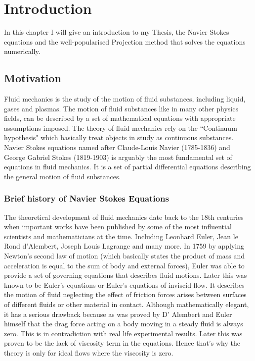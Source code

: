 
\chapter{Introduction}
\label{chapter1}
In this chapter I will give an introduction to my Thesis, the Navier Stokes equations and the well-popularised Projection method that solves the equations numerically.

\section{Motivation}
Fluid mechanics is the study of the motion of fluid substances, including liquid, gases and plasmas. The motion of fluid substances like in many other physics fields, can be described by a set of mathematical equations with appropriate assumptions imposed. The theory of fluid mechanics rely on the ``Continuum hypothesis" which basically treat objects in study as continuous substances. Navier Stokes equations named after Claude-Louis Navier (1785-1836) and George Gabriel Stokes (1819-1903) is arguably the most fundamental set of equations in fluid mechanics. It is a set of partial differential equations describing the general motion of fluid substances.\\

\subsection{Brief history of Navier Stokes Equations}
The theoretical development of fluid mechanics date back to the 18th centuries when important works have been published by some of the most influential scientists and mathematicians at the time. Including Leonhard Euler, Jean le Rond d'Alembert, Joseph Louis Lagrange and many more. In 1759 by applying Newton's second law of motion (which basically states the product of mass and acceleration is equal to the sum of body and external forces), Euler was able to provide a set of governing equations that describes fluid motions. Later this was known to be Euler's equations or Euler's equations of inviscid flow. It describes the motion of fluid neglecting the effect of friction forces arises between surfaces of different fluids or other material in contact. Although mathematically elegant, it has a serious drawback because as was proved by D' Alembert and Euler himself that the drag force acting on a body moving in a steady fluid is always zero. This is in contradiction with real life experimental results. Later this was proven to be the lack of viscosity term in the equations. Hence that's why the theory is only for ideal flows where the viscosity is zero. \\

